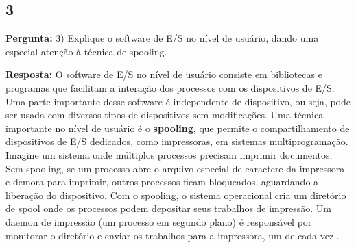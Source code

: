 \documentclass{article}
\begin{document}
\subsection{3}

\textbf{Pergunta:} 3) Explique o software de E/S no nível de usuário, dando uma especial atenção à técnica de spooling. \newline

\textbf{Resposta: }O software de E/S no nível de usuário consiste em bibliotecas e programas que facilitam a interação dos processos com os dispositivos de E/S. Uma parte importante desse software é independente de dispositivo, ou seja, pode ser usada com diversos tipos de dispositivos sem modificações. Uma técnica importante no nível de usuário é o \textbf{spooling}, que permite o compartilhamento de dispositivos de E/S dedicados, como impressoras, em sistemas multiprogramação.
Imagine um sistema onde múltiplos processos precisam imprimir documentos. Sem spooling, se um processo abre o arquivo especial de caractere da impressora e demora para imprimir, outros processos ficam bloqueados, aguardando a liberação do dispositivo. Com o spooling, o sistema operacional cria um diretório de spool onde os processos podem depositar seus trabalhos de impressão. Um daemon de impressão (um processo em segundo plano) é responsável por monitorar o diretório e enviar os trabalhos para a impressora, um de cada vez \parencite[p. 254]{tanenbaum2021}.

\printbibliography %
\end{document}
